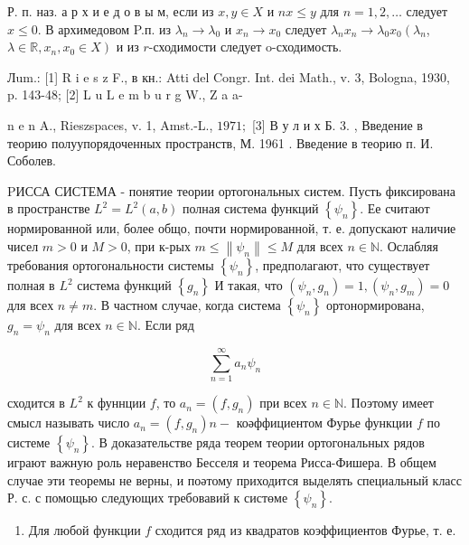 \documentclass[10pt]{article}
\begin{document}
Р. п. наз. а р х и е д о в ы м, если из $x, y \in X$ и $n x \leqslant y$ для $n=1,2, \ldots$ следует $x \leqslant 0$. В архимедовом P.п. из $\lambda_{n} \rightarrow \lambda_{0}$ и $x_{n} \rightarrow x_{0}$ следует $\lambda_{n} x_{n} \rightarrow \lambda_{0} x_{0}\left(\lambda_{n}\right.$, $\left.\lambda \in \mathbb{R}, x_{n}, x_{0} \in X\right)$ и из $r$-сходимости следует o-сходимость.



Лum.: [1] R i e s z F., в кн.: Atti del Congr. Int. dei Math., v. 3, Bologna, 1930, p. 143-48; [2] L u $\mathrm{L}$ e $\mathrm{m}$ b u r g W., Z a a-

n e n A., Rieszspaces, v. 1, Amst.-L., $1971 ;$ [3] В у л и х Б. 3. , Введение в теорию полуупорядоченных пространств, М. 1961 . Введение в теорию п. И. Соболев.



PИССА СИСТЕМА - понятие теории ортогональных систем. Пусть фиксирована в пространстве $L^{2}=L^{2}(a, b)$ полная система функций $\left\{\psi_{n}\right\}$. Ее считают нормированной или, более общо, почти нормированной, т. е. допускают наличие чисел $m>0$ и $M>0$, при к-рых $m \leqslant\left\|\psi_{n}\right\| \leqslant M$ для всех $n \in \mathbb{N}$. Ослабляя требования ортогональности системы $\left\{\psi_{n}\right\}$, предполагают, что существует полная в $L^{2}$ система функций $\left\{g_{n}\right\}$ И такая, что $\left(\psi_{n}, g_{n}\right)=1,\left(\psi_{n}, g_{m}\right)=0$ для всех $n \neq m$. В частном случае, когда система $\left\{\psi_{n}\right\}$ ортонормирована, $g_{n}=\psi_{n}$ для всех $n \in \mathbb{N}$. Если ряд



\[

\sum_{n=1}^{\infty} a_{n} \psi_{n}

\]



сходится в $L^{2}$ к фуннции $f$, то $a_{n}=\left(f, g_{n}\right)$ при всех $n \in \mathbb{N}$. Поэтому имеет смысл называть число $a_{n}=\left(f, g_{n}\right) n-$ коәффициентом Фурье функции $f$ по системе $\left\{\psi_{n}\right\}$. В доказательстве ряда теорем теории ортогональных рядов играют важную роль неравенство Бесселя и теорема Рисса-Фишера. В общем случае эти теоремы не верны, и поәтому приходится выделять специальный класс Р. с. с помощью следующих требовавий к систөме $\left\{\psi_{n}\right\}$.



\begin{enumerate}

  \item Для любой функции $f$ сходится ряд из квадратов коэффициентов Фурье, т. е.

\end{enumerate}
\end{document}
